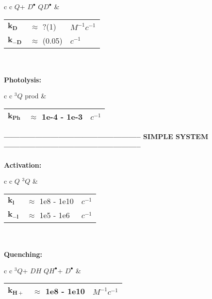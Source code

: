 \documentclass{article}
\def\QH{$QH^{\bullet }$}
\def\D{$D^{\bullet }$}
\def\Q{$Q$}
\def\Qt{$^{3}Q$}
\def\DH{$DH$}
\def\QD{$QD^{\bullet }$}
\begin{document}
\begin{tabular}{ c c }
    \schemestart
    \Q + \D
    \arrow{<=>[$k_{D}$][$k_{-D}$]}
    \QD
    \schemestop
     & \begin{tabular}{ l l l }
           $\mathbf{k_{D}}$  & $\approx$ ?(1)   & $M^{-1}c^{-1}$ \\
           $\mathbf{k_{-D}}$ & $\approx$ (0.05) & $c^{-1}$       \\\hline
       \end{tabular}
    \vspace{1.5mm}
\end{tabular}
\vspace{1.5mm}
\\
\\
\textbf{Photolysis:}
\begin{tabular}{ c c }
    \schemestart
    \Qt
    \arrow{->[$k_{Ph}$]}
    prod
    \schemestop
     & \begin{tabular}{ l l l }
           $\mathbf{k_{Ph}}$ & $\approx$ 1e-4 - 1e-3 & $c^{-1}$ \\\hline
       \end{tabular}
    \vspace{1.5mm}
\end{tabular}
\vspace{1.5mm}


\newpage
\textbf{----------------------------------------------------- SIMPLE SYSTEM -----------------------------------------------------}
\\
\\
\textbf{Activation:}
\begin{tabular}{ c c }
    \schemestart
    \Q
    \arrow{<=>[$h\nu$, $k_l$][$k_{-l}$]}
    \Qt
    \schemestop
     & \begin{tabular}{ l l l }
           $\mathbf{k_l}$    & $\approx$ 1e8 - 1e10 & $c^{-1}$ \\
           $\mathbf{k_{-l}}$ & $\approx$ 1e5  - 1e6 & $c^{-1}$ \\\hline
       \end{tabular}
    \vspace{1.5mm}
\end{tabular}
\vspace{1.5mm}
\\
\\
\textbf{Quenching:}

\begin{tabular}{ c c }
    \schemestart
    \Qt + \DH
    \arrow{->[$k_{H+}$]}
    \QH + \D
    \schemestop
     & \begin{tabular}{ l l l }
           $\mathbf{k_{H+}}$ & $\approx$ 1e8 - 1e10 & $M^{-1}c^{-1}$ \\\hline
       \end{tabular}
    \vspace{1.5mm}
\end{tabular}
\vspace{1.5mm}
\end{document}
